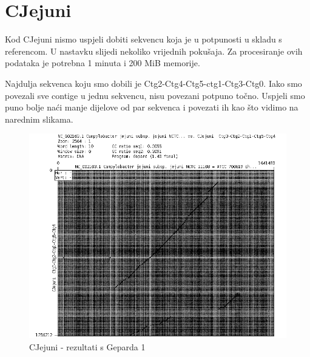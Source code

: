 \section{CJejuni}
Kod CJejuni nismo uspjeli dobiti sekvencu koja je u potpunosti u skladu s referencom. U nastavku slijedi nekoliko vrijednih pokušaja. Za procesiranje ovih podataka je potrebna 1 minuta i 200 MiB memorije. 


Najdulja sekvenca koju smo dobili je Ctg2-Ctg4-Ctg5-ctg1-Ctg3-Ctg0. Iako smo povezali sve contige u jednu sekvencu, nisu povezani potpuno točno. Uspjeli smo puno bolje naći manje dijelove od par sekvenca i povezati ih kao što vidimo na narednim slikama.


\begin{figure}[H]
    \centering
    \includegraphics[scale=0.5]{img/Grah8.png}
    \caption{CJejuni - rezultati s Geparda 1}
    \label{fig:cjejuni1}
\end{figure}


